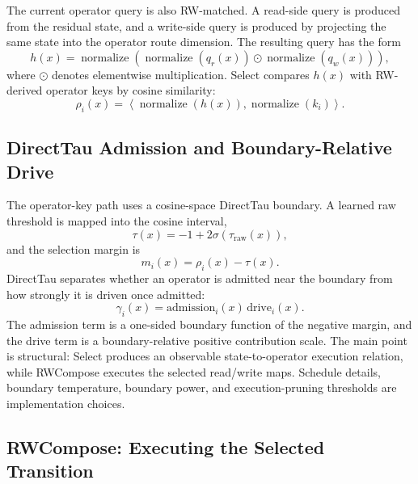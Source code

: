 \documentclass{article}
\begin{document}
The current operator query is also RW-matched. A read-side query is produced from the residual state, and a write-side query is produced by projecting the same state into the operator route dimension. The resulting query has the form
\begin{equation}
    h(x)=\operatorname{normalize}\!\left(
    \operatorname{normalize}(q_r(x))\odot
    \operatorname{normalize}(q_w(x))
    \right),
    \label{eq:method_rw_matched_query}
\end{equation}
where \(\odot\) denotes elementwise multiplication. Select compares \(h(x)\) with RW-derived operator keys by cosine similarity:
\begin{equation}
    \rho_i(x)=\left\langle \operatorname{normalize}(h(x)),\operatorname{normalize}(k_i)\right\rangle .
    \label{eq:method_operator_score}
\end{equation}

\subsection{DirectTau Admission and Boundary-Relative Drive}

The operator-key path uses a cosine-space DirectTau boundary. A learned raw threshold is mapped into the cosine interval,
\begin{equation}
    \tau(x)=-1+2\sigma(\tau_{\mathrm{raw}}(x)),
\end{equation}
and the selection margin is
\begin{equation}
    m_i(x)=\rho_i(x)-\tau(x).
\end{equation}
DirectTau separates whether an operator is admitted near the boundary from how strongly it is driven once admitted:
\begin{equation}
    \gamma_i(x)=\mathrm{admission}_i(x)\,\mathrm{drive}_i(x).
    \label{eq:method_directtau_gate}
\end{equation}
The admission term is a one-sided boundary function of the negative margin, and the drive term is a boundary-relative positive contribution scale. The main point is structural: Select produces an observable state-to-operator execution relation, while RWCompose executes the selected read/write maps. Schedule details, boundary temperature, boundary power, and execution-pruning thresholds are implementation choices.

\subsection{RWCompose: Executing the Selected Transition}
\end{document}
